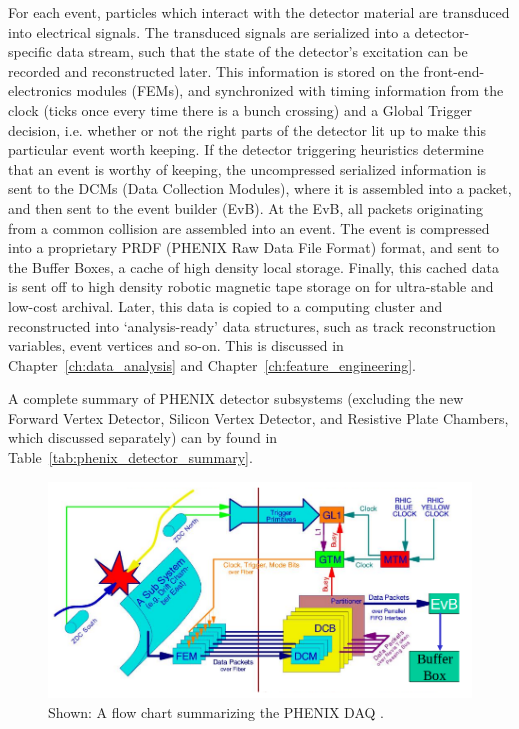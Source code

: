For each event, particles which interact with the detector material are
transduced into electrical signals. The transduced signals are serialized into a
detector-specific data stream, such that the state of the detector's excitation
can be recorded and reconstructed later. This information is stored on the
front-end-electronics modules (FEMs), and synchronized with timing information
from the clock (ticks once every time there is a bunch crossing) and a Global
Trigger decision, i.e.  whether or not the right parts of the detector lit up to
make this particular event worth keeping. If the detector triggering heuristics
determine that an event is worthy of keeping, the uncompressed serialized
information is sent to the DCMs (Data Collection Modules), where it is assembled
into a packet, and then sent to the event builder (EvB). At the EvB, all packets
originating from a common collision are assembled into an event.  The event is
compressed into a proprietary PRDF (PHENIX Raw Data File Format) format, and
sent to the Buffer Boxes, a cache of high density local storage. Finally, this
cached data is sent off to high density robotic magnetic tape storage on for
ultra-stable and low-cost archival. Later, this data is copied to a computing
cluster and reconstructed into `analysis-ready' data structures, such as track
reconstruction variables, event vertices and so-on. This is discussed in
Chapter~\ref{ch:data_analysis} and Chapter~\ref{ch:feature_engineering}.

A complete summary of PHENIX detector subsystems (excluding the new Forward
Vertex Detector, Silicon Vertex Detector, and Resistive Plate Chambers, which
discussed separately) can by found in Table~\ref{tab:phenix_detector_summary}.

\begin{figure}
  \includegraphics[width=\linewidth]{./figures/daq_overview}
  \caption{ 
    Shown: A flow chart summarizing the PHENIX DAQ \cite{Desmond2016}. 
  }
  \label{fig:phenix_daq_overview}
\end{figure}


